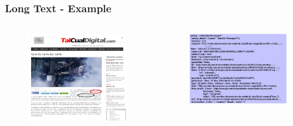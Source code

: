 \documentclass[red]{beamer}
\begin{document}
\begin{frame}
    \frametitle{Long Text - Example}

   \begin{columns}
       \hspace{-1em}
       \begin{figure}
           \includegraphics[scale=0.27]{pp_example}
       \end{figure}
       \begin{figure}
           \includegraphics[scale=0.27]{rss_example}
       \end{figure}
   \end{columns}
\end{frame}
\end{document}
